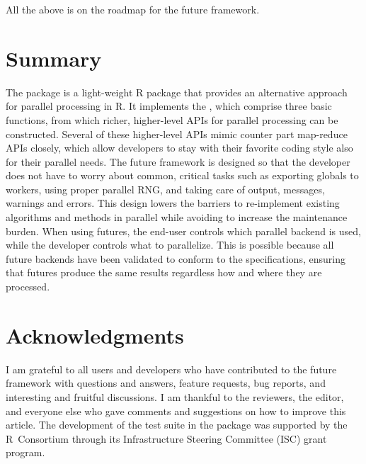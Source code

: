 All the above is on the roadmap for the future framework.


\section{Summary}

The  package is a light-weight R package that provides an
alternative approach for parallel processing in R.  It implements
the , which comprise three basic functions, from which
richer, higher-level APIs for parallel processing can be constructed.
Several of these higher-level APIs mimic counter part map-reduce APIs
closely, which allow developers to stay with their favorite coding
style also for their parallel needs.  The future framework is designed
so that the developer does not have to worry about common, critical
tasks such as exporting globals to workers, using proper parallel RNG,
and taking care of output, messages, warnings and errors.  This design
lowers the barriers to re-implement existing algorithms and methods in
parallel while avoiding to increase the maintenance burden.  When
using futures, the end-user controls which parallel backend is used,
while the developer controls what to parallelize.  This is possible
because all future backends have been validated to conform to
the  specifications, ensuring that futures produce the
same results regardless how and where they are processed.


\section{Acknowledgments}
\label{acknowledgements}
 
I am grateful to all users and developers who have contributed to the
future framework with questions and answers, feature requests, bug
reports, and interesting and fruitful discussions.  I am thankful to
the reviewers, the editor, and everyone else who gave comments and
suggestions on how to improve this article.  The development of
the  test suite in
the  package was supported by the R~Consortium
through its Infrastructure Steering Committee (ISC) grant program.




\address{%
Henrik Bengtsson\\
Department of Epidemiology and Biostatistics,\\
University of California, San Francisco\\
San Francisco, CA\\
United States\\
}
